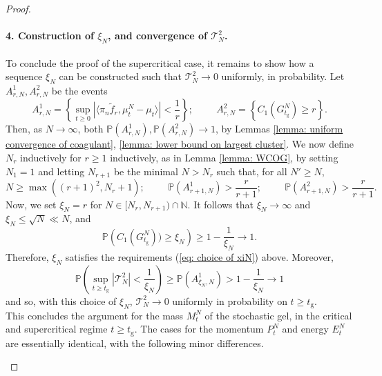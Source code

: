 \documentclass[11pt, notitlepage]{article}
\begin{document}
\begin{proof}
       \paragraph{4. Construction of $\xi_N$, and convergence of $\mathcal{T}^2_N$.} To conclude the proof of the supercritical case, it remains to show how a sequence $\xi_N$ can be constructed such that $\mathcal{T}^2_N \rightarrow 0$ uniformly, in probability. Let $A^1_{r,N}, A^2_{r,N}$ be the events \begin{equation} \label{eq: definition of A1rn}
       A^1_{r,N}=\left\{\sup_{t\geq 0} |\langle \pi_n \widetilde{f}_r, \mu^N_t-\mu_t\rangle|<\frac{1}{r}\right\}; \hspace{1cm}
       A^2_{r,N}=\left\{C_1(G^N_{t_\mathrm{g}}) \geq r\right\}.
   \end{equation} Then, as $N\rightarrow \infty$, both $\mathbb{P}(A^1_{r,N}), \mathbb{P}(A^2_{r,N}) \rightarrow 1$, by Lemmas \ref{lemma: uniform convergence of coagulant}, \ref{lemma: lower bound on largest cluster}. We now define $N_r$ inductively for $r\geq 1$ inductively, as in Lemma \ref{lemma: WCOG}, by setting $N_1=1$ and letting $N_{r+1}$  be the minimal $N>N_r$ such that, for all $N'\ge N$, \begin{equation}
       \label{eq: recursive definition of Nr} N\geq \max((r+1)^2, N_r+1);\hspace{1cm}  \mathbb{P}(A^1_{r+1,N})>\frac{r}{r+1};\hspace{1cm}  \mathbb{P}(A^2_{r+1,N})>\frac{r}{r+1}.
   \end{equation} Now, we set $\xi_N=r$ for $N\in [N_r, N_{r+1})\cap\mathbb{N}.$ It follows that $\xi_N \rightarrow \infty$ and $\xi_N\leq \sqrt{N}\ll N$, and \begin{equation}
       \mathbb{P}\left(C_1(G^N_{t_\mathrm{g}}))\geq \xi_N\right)\ge 1-\frac{1}{\xi_N} \rightarrow 1. 
   \end{equation} Therefore, $\xi_N$ satisfies the requirements (\ref{eq: choice of xiN}) above. Moreover, \begin{equation}
       \mathbb{P}\left(\sup_{t\geq t_\mathrm{g}} |\mathcal{T}^2_N| <\frac{1}{\xi_N}\right) \ge \mathbb{P}\left(A^1_{\xi_N,N}\right) > 1-\frac{1}{\xi_N}\rightarrow 1
   \end{equation} and so, with this choice of $\xi_N$, $\mathcal{T}^2_N \rightarrow 0$ uniformly in probability on $t\ge t_\mathrm{g}.$ \bigskip \\ This concludes the argument for the mass $M^N_t$ of the stochastic gel, in the critical and supercritical regime $t\ge t_\mathrm{g}$. The cases for the momentum $P^N_t$ and energy $E^N_t$ are essentially identical, with the following minor differences. \begin{enumerate}[label=\roman{*}).]

\end{enumerate}
\end{proof}
\end{document}
